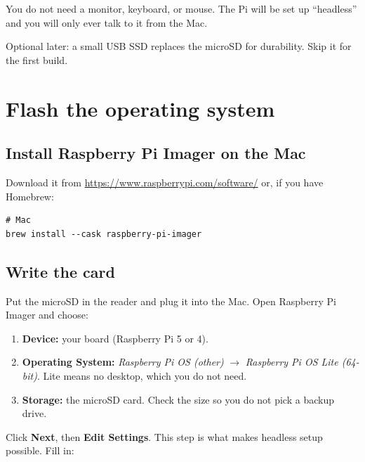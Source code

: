 \documentclass[11pt,letterpaper]{article}
\begin{document}
\medskip
You do not need a monitor, keyboard, or mouse. The Pi will be set up ``headless'' and you will only ever talk to it from the Mac.

Optional later: a small USB SSD replaces the microSD for durability. Skip it for the first build.

\section{Flash the operating system}

\subsection{Install Raspberry Pi Imager on the Mac}

Download it from \url{https://www.raspberrypi.com/software/} or, if you have Homebrew:

\begin{lstlisting}
# Mac
brew install --cask raspberry-pi-imager
\end{lstlisting}

\subsection{Write the card}

Put the microSD in the reader and plug it into the Mac. Open Raspberry Pi Imager and choose:

\begin{enumerate}[nosep]
  \item \textbf{Device:} your board (Raspberry Pi 5 or 4).
  \item \textbf{Operating System:} \emph{Raspberry Pi OS (other)} $\rightarrow$ \emph{Raspberry Pi OS Lite (64-bit)}. Lite means no desktop, which you do not need.
  \item \textbf{Storage:} the microSD card. Check the size so you do not pick a backup drive.
\end{enumerate}

Click \textbf{Next}, then \textbf{Edit Settings}. This step is what makes headless setup possible. Fill in:
\end{document}
